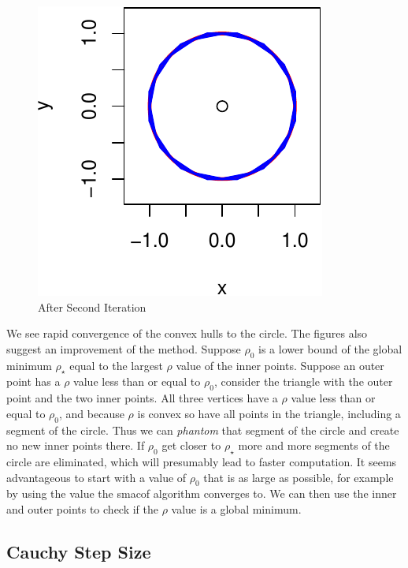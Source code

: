 \documentclass[
  12pt,
  letterpaper,
  DIV=11,
  numbers=noendperiod]{scrreprt}
\theoremstyle{remark}
\begin{document}
\begin{figure}[H]

{\centering \includegraphics{global_files/figure-pdf/globalcircleplotthird-1.pdf}

}

\caption{After Second Iteration}

\end{figure}%

We see rapid convergence of the convex hulls to the circle. The figures
also suggest an improvement of the method. Suppose \(\rho_0\) is a lower
bound of the global minimum \(\rho_\star\) equal to the largest \(\rho\)
value of the inner points. Suppose an outer point has a \(\rho\) value
less than or equal to \(\rho_0\), consider the triangle with the outer
point and the two inner points. All three vertices have a \(\rho\) value
less than or equal to \(\rho_0\), and because \(\rho\) is convex so have
all points in the triangle, including a segment of the circle. Thus we
can \emph{phantom} that segment of the circle and create no new inner
points there. If \(\rho_0\) get closer to \(\rho_\star\) more and more
segments of the circle are eliminated, which will presumably lead to
faster computation. It seems advantageous to start with a value of
\(\rho_0\) that is as large as possible, for example by using the value
the smacof algorithm converges to. We can then use the inner and outer
points to check if the \(\rho\) value is a global minimum.

\subsection{Cauchy Step Size}\label{cauchy-step-size-1}
\end{document}

